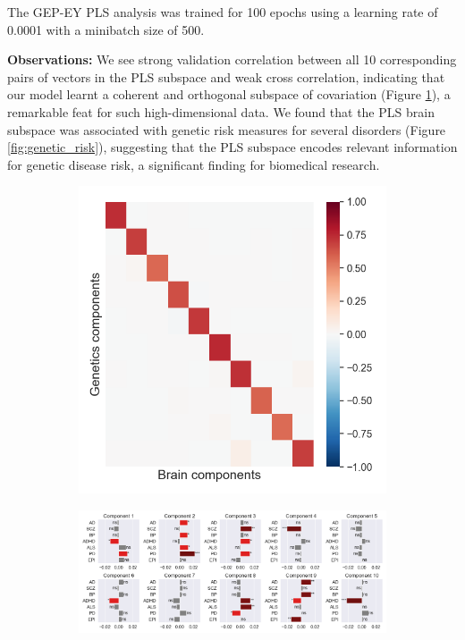 The GEP-EY PLS analysis was trained for 100 epochs using a learning rate of 0.0001 with a minibatch size of 500.

\textbf{Observations:} We see strong validation correlation between all 10 corresponding pairs of vectors in the PLS subspace and weak cross correlation, indicating that our model learnt a coherent and orthogonal subspace of covariation (Figure \ref{fig:UKBB_corr}), a remarkable feat for such high-dimensional data. We found that the PLS brain subspace was associated with genetic risk measures for several disorders (Figure \ref{fig:genetic_risk}), suggesting that the PLS subspace encodes relevant information for genetic disease risk, a significant finding for biomedical research.

\begin{figure}
    \centering
    \begin{subfigure}[b]{0.27\textwidth}
        \centering
        \includegraphics[width=\textwidth,trim={0.8cm 0cm 0.3cm 0cm}]{figures/UKBB/cross_corr.png}
        \caption{}
        \label{fig:UKBB_corr}
    \end{subfigure}
    \begin{subfigure}[b]{0.72\textwidth}
        \centering
        \includegraphics[width=\textwidth,trim={0.5cm 0cm 0.7cm 0cm}]{figures/UKBB/prs_correlations.png}

\end{subfigure}
\end{figure}
